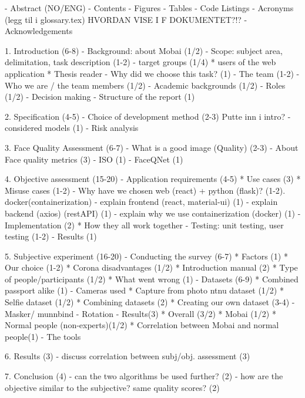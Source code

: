 - Abstract (NO/ENG)
- Contents
- Figures
- Tables
- Code Listings
- Acronyms (legg til i glossary.tex) HVORDAN VISE I F DOKUMENTET?!?
- Acknowledgements

1. Introduction (6-8)
 - Background: about Mobai (1/2)
 - Scope: subject area, delimitation, task description (1-2)
 - target groups (1/4)
    * users of the web application
    * Thesis reader
 - Why did we choose this task? (1)
 - The team (1-2)
   - Who we are / the team members (1/2)
   - Academic backgrounds (1/2)
   - Roles (1/2)
   - Decision making
 - Structure of the report (1)
 
 2. Specification (4-5)
    - Choice of development method (2-3) Putte inn i intro?
        - considered models (1)
    - Risk analysis
    
    
3. Face Quality Assessment (6-7)
    - What is a good image (Quality) (2-3)
    - About Face quality metrics (3)
        - ISO (1)
        - FaceQNet (1)
  
  
4. Objective assessment (15-20)
    - Application requirements (4-5)
        * Use cases (3)
        * Misuse cases (1-2)
    - Why have we chosen web (react) + python (flask)? (1-2). docker(containerization) 
    - explain frontend (react, material-ui) (1)
    - explain backend (axios) (restAPI) (1)
    - explain why we use containerization (docker) (1)
    - Implementation (2)
        * How they all work together
    - Testing: unit testing, user testing (1-2)
    - Results (1)
    

5. Subjective experiment (16-20)
   - Conducting the survey  (6-7)
        * Factors (1) 
        * Our choice (1-2) 
        * Corona disadvantages (1/2)
        * Introduction manual (2) 
        * Type of people/participants (1/2)
        * What went wrong (1)
    - Datasets (6-9)
        * Combined passport alike (1)
            - Cameras used
        * Capture from photo ntnu dataset (1/2)
        * Selfie dataset (1/2)
        * Combining datasets (2)
        * Creating our own dataset (3-4)
            - Masker/ munnbind 
            - Rotation 
    - Results(3) 
        * Overall (3/2)
        * Mobai (1/2)
        * Normal people (non-experts)(1/2)
        * Correlation between Mobai and normal people(1)
            - The tools
 
6. Results (3)
     - discuss correlation between subj/obj. assessment (3)
  
7. Conclusion (4)
    - can the two algorithms be used further? (2)
    - how are the objective similar to the subjective? same quality scores? (2)
  
 
 
 